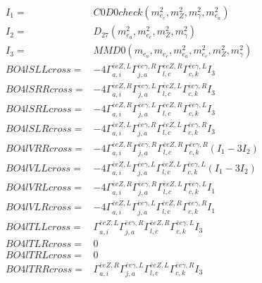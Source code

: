 \documentclass[A4,landscape]{article}
\begin{document}
\begin{align} 
I_1 = & C0D0check(m^2_{e_{{c}}}, m^2_{Z}, m^2_{\gamma}, m^2_{e_{{a}}}) \\ 
I_2 = & D_{27}(m^2_{e_{{a}}}, m^2_{e_{{c}}}, m^2_{Z}, m^2_{\gamma}) \\ 
I_3 = & MMD0(m_{e_{{a}}}, m_{e_{{c}}}, m^2_{e_{{a}}}, m^2_{e_{{c}}}, m^2_{Z}, m^2_{\gamma}) \\ 
  BO4lSLLcross= & -4  \Gamma^{\bar{e}e Z ,L}_{a, i} \Gamma^{\bar{e}e \gamma ,R}_{j, a} \Gamma^{\bar{e}e Z ,R}_{l, c} \Gamma^{\bar{e}e \gamma ,L}_{c, k} I_3 \\ 
  BO4lSRRcross= & -4  \Gamma^{\bar{e}e Z ,R}_{a, i} \Gamma^{\bar{e}e \gamma ,L}_{j, a} \Gamma^{\bar{e}e Z ,L}_{l, c} \Gamma^{\bar{e}e \gamma ,R}_{c, k} I_3 \\ 
  BO4lSRLcross= & -4  \Gamma^{\bar{e}e Z ,R}_{a, i} \Gamma^{\bar{e}e \gamma ,L}_{j, a} \Gamma^{\bar{e}e Z ,R}_{l, c} \Gamma^{\bar{e}e \gamma ,L}_{c, k} I_3 \\ 
  BO4lSLRcross= & -4  \Gamma^{\bar{e}e Z ,L}_{a, i} \Gamma^{\bar{e}e \gamma ,R}_{j, a} \Gamma^{\bar{e}e Z ,L}_{l, c} \Gamma^{\bar{e}e \gamma ,R}_{c, k} I_3 \\ 
  BO4lVRRcross= & -4  \Gamma^{\bar{e}e Z ,R}_{a, i} \Gamma^{\bar{e}e \gamma ,R}_{j, a} \Gamma^{\bar{e}e Z ,R}_{l, c} \Gamma^{\bar{e}e \gamma ,R}_{c, k} (I_1 - 3 I_2) \\ 
  BO4lVLLcross= & -4  \Gamma^{\bar{e}e Z ,L}_{a, i} \Gamma^{\bar{e}e \gamma ,L}_{j, a} \Gamma^{\bar{e}e Z ,L}_{l, c} \Gamma^{\bar{e}e \gamma ,L}_{c, k} (I_1 - 3 I_2) \\ 
  BO4lVRLcross= & -4  \Gamma^{\bar{e}e Z ,R}_{a, i} \Gamma^{\bar{e}e \gamma ,R}_{j, a} \Gamma^{\bar{e}e Z ,L}_{l, c} \Gamma^{\bar{e}e \gamma ,L}_{c, k} I_1 \\ 
  BO4lVLRcross= & -4  \Gamma^{\bar{e}e Z ,L}_{a, i} \Gamma^{\bar{e}e \gamma ,L}_{j, a} \Gamma^{\bar{e}e Z ,R}_{l, c} \Gamma^{\bar{e}e \gamma ,R}_{c, k} I_1 \\ 
  BO4lTLLcross= &  \Gamma^{\bar{e}e Z ,L}_{a, i} \Gamma^{\bar{e}e \gamma ,R}_{j, a} \Gamma^{\bar{e}e Z ,R}_{l, c} \Gamma^{\bar{e}e \gamma ,L}_{c, k} I_3 \\ 
  BO4lTLRcross= & 0 \\ 
  BO4lTRLcross= & 0 \\ 
  BO4lTRRcross= &  \Gamma^{\bar{e}e Z ,R}_{a, i} \Gamma^{\bar{e}e \gamma ,L}_{j, a} \Gamma^{\bar{e}e Z ,L}_{l, c} \Gamma^{\bar{e}e \gamma ,R}_{c, k} I_3 \\ 
\end{align} 
\end{document}
